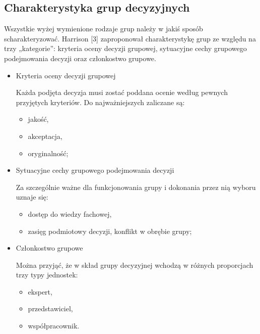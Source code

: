 \subsection{Charakterystyka grup decyzyjnych}
Wszystkie wyżej wymienione rodzaje grup należy w jakiś sposób scharakteryzować. 
Harrison [3] zaproponował charakterystykę grup ze względu na trzy „kategorie”: 
kryteria oceny decyzji grupowej, sytuacyjne cechy grupowego podejmowania decyzji
oraz członkostwo grupowe.

\begin{itemize}
  \item Kryteria oceny decyzji grupowej
  
  Każda podjęta decyzja musi zostać poddana ocenie według pewnych przyjętych
  kryteriów.
  Do najważniejszych zaliczane są:
  \begin{itemize}
    \item jakość, 
    \item akceptacja, 
    \item oryginalność;
  \end{itemize}
  
  \item Sytuacyjne cechy grupowego podejmowania decyzji
  
  Za szczególnie ważne dla funkcjonowania grupy i dokonania przez nią wyboru
  uznaje się:
  \begin{itemize}
    \item dostęp do wiedzy fachowej,
    \item zasięg podmiotowy decyzji,
    konflikt w obrębie grupy;
  \end{itemize}
  
  \item Członkostwo grupowe
  
  Można przyjąć, że w skład grupy decyzyjnej wchodzą w różnych proporcjach trzy
  typy jednostek:
  \begin{itemize}
    \item ekspert,
    \item przedstawiciel,
    \item współpracownik.
  \end{itemize}
\end{itemize}

